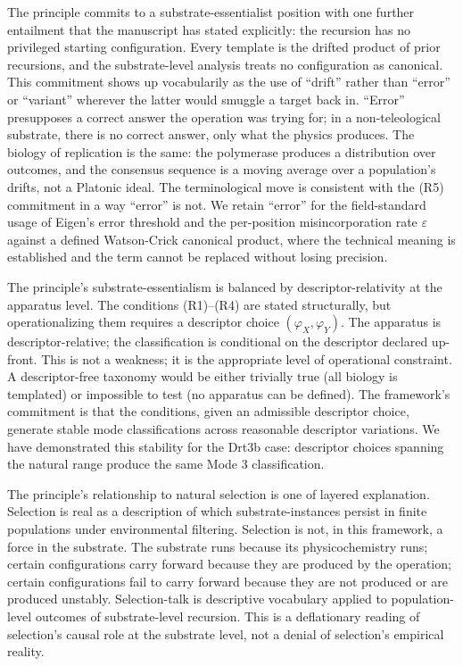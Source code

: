 \documentclass[aps,prx,reprint,amsmath,amssymb,floatfix,superscriptaddress,nofootinbib]{revtex4-2}
\theoremstyle{plain-thm}
\theoremstyle{definition-thm}
\newcommand{\descX}{\varphi_X}
\newcommand{\descY}{\varphi_Y}
\begin{document}
The principle commits to a substrate-essentialist position with one further entailment that the manuscript has stated explicitly: the recursion has no privileged starting configuration. Every template is the drifted product of prior recursions, and the substrate-level analysis treats no configuration as canonical. This commitment shows up vocabularily as the use of ``drift'' rather than ``error'' or ``variant'' wherever the latter would smuggle a target back in. ``Error'' presupposes a correct answer the operation was trying for; in a non-teleological substrate, there is no correct answer, only what the physics produces. The biology of replication is the same: the polymerase produces a distribution over outcomes, and the consensus sequence is a moving average over a population's drifts, not a Platonic ideal. The terminological move is consistent with the (R5) commitment in a way ``error'' is not. We retain ``error'' for the field-standard usage of Eigen's error threshold and the per-position misincorporation rate $\varepsilon$ against a defined Watson-Crick canonical product, where the technical meaning is established and the term cannot be replaced without losing precision.

The principle's substrate-essentialism is balanced by descriptor-relativity at the apparatus level. The conditions (R1)--(R4) are stated structurally, but operationalizing them requires a descriptor choice $(\descX, \descY)$. The apparatus is descriptor-relative; the classification is conditional on the descriptor declared up-front. This is not a weakness; it is the appropriate level of operational constraint. A descriptor-free taxonomy would be either trivially true (all biology is templated) or impossible to test (no apparatus can be defined). The framework's commitment is that the conditions, given an admissible descriptor choice, generate stable mode classifications across reasonable descriptor variations. We have demonstrated this stability for the Drt3b case: descriptor choices spanning the natural range produce the same Mode 3 classification.

The principle's relationship to natural selection is one of layered explanation. Selection is real as a description of which substrate-instances persist in finite populations under environmental filtering. Selection is not, in this framework, a force in the substrate. The substrate runs because its physicochemistry runs; certain configurations carry forward because they are produced by the operation; certain configurations fail to carry forward because they are not produced or are produced unstably. Selection-talk is descriptive vocabulary applied to population-level outcomes of substrate-level recursion. This is a deflationary reading of selection's causal role at the substrate level, not a denial of selection's empirical reality.
\end{document}
